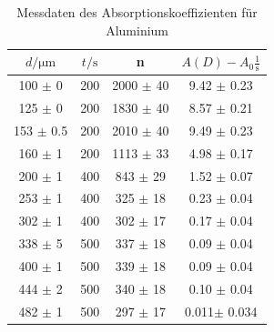 \begin{table}
    \center
    \begin{tabular}{c c c c}
        \toprule
        $d / \unit{\micro\meter}$ &  $t / \unit\second$ &     n & $A(D) - A_0 \frac{1}{\unit\second}$\\
        \midrule
                100 $\pm$ 0&    200 &   2000  $\pm$  40 &   9.42 $\pm$ 0.23 \\
                125 $\pm$ 0&    200 &   1830  $\pm$  40 &   8.57 $\pm$ 0.21 \\
                153 $\pm$ 0.5&    200 &   2010  $\pm$  40 &   9.49 $\pm$ 0.23 \\
                160 $\pm$ 1&    200 & 1113 $\pm$ 33 &   4.98 $\pm$ 0.17 \\
                200 $\pm$ 1&    400 &  843 $\pm$ 29 &   1.52 $\pm$ 0.07 \\
                253 $\pm$ 1&    400 &  325 $\pm$ 18 &   0.23 $\pm$ 0.04 \\
                302 $\pm$ 1&    400 &  302 $\pm$ 17 &   0.17 $\pm$ 0.04 \\
                338 $\pm$ 5&    500 &  337 $\pm$ 18 &   0.09 $\pm$ 0.04 \\
                400 $\pm$ 1&    500 &  339 $\pm$ 18 &   0.09 $\pm$ 0.04 \\
                444 $\pm$ 2&    500 &  340 $\pm$ 18 &   0.10 $\pm$ 0.04 \\
                482 $\pm$ 1&    500 &  297 $\pm$ 17 &   0.011$\pm$ 0.034\\
        \bottomrule
    \end{tabular}
    \caption{Messdaten des Absorptionskoeffizienten für Aluminium}
    \label{tab:md3alu}
\end{table}